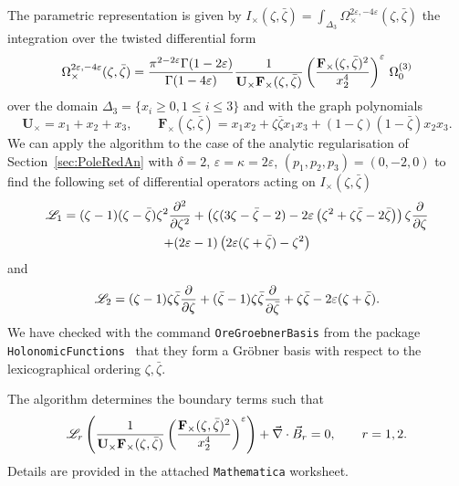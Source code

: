 \documentclass[a4paper,12pt]{article}
\numberwithin{equation}{section}
\numberwithin{figure}{section}
\begin{document}
The parametric representation is given by
$
  I_\times(\zeta,\bar\zeta)= \int_{\Delta_3}   \Omega_\times^{2\varepsilon,-4\varepsilon}(\zeta,\bar\zeta)
$ the integration over the twisted differential form
\begin{equation}
  \Omega_\times^{2\varepsilon,-4\varepsilon}(\zeta,\bar\zeta)={\pi^{2-2\varepsilon}\Gamma(1-2\varepsilon)\over\Gamma(1-4\varepsilon)} {1\over \textbf{U}_\times
    \textbf{F}_\times (\zeta,\bar\zeta)} \left(
    \textbf{F}_\times (\zeta,\bar\zeta)^{2}\over  x_2^{4}\right)^\varepsilon  \, \Omega_0^{(3)}
\end{equation}
over the domain $\Delta_3=\{x_i\geq0, 1\leq i\leq 3\}$ and with the graph polynomials
\begin{equation}
  \textbf{U}_\times= x_1+x_2+x_3,  \qquad \textbf{F}_\times (\zeta,\bar\zeta)= x_1x_2+
  \zeta\bar\zeta x_1x_3+ (1-\zeta)(1-\bar\zeta)x_2x_3  .
\end{equation}
We can apply the algorithm to the case of the analytic regularisation
of Section~\ref{sec:PoleRedAn} 
with $\delta=2$, $\varepsilon=\kappa=2\varepsilon$, $(p_1,p_2,p_3)=(0,-2,0)$
to find the following set of  differential operators
acting on $I_\times(\zeta,\bar\zeta)$
\begin{multline}
  \mathscr{L}_1= (\zeta -1) (\zeta -\bar\zeta) \zeta ^2{\partial^2\over\partial\zeta^2}  +
   \left(\zeta (3 \zeta -\bar\zeta-2)-2\varepsilon  \left(\zeta ^2+\zeta 
   \bar\zeta-2 \bar\zeta\right) \right) \zeta {\partial\over\partial\zeta}\cr+(2 \varepsilon -1) \left(2 \varepsilon  (\zeta +\bar\zeta)-\zeta ^2\right)
\end{multline}
and
\begin{equation}
  \mathscr{L}_{2}= (\zeta -1)\zeta\bar\zeta{\partial\over\partial\zeta}  +
   (\bar\zeta -1)\zeta\bar\zeta{\partial\over\partial\bar\zeta}+\zeta\bar\zeta-2\varepsilon(\zeta+\bar\zeta).
 \end{equation}
 We have checked  with
  the command {\tt OreGroebnerBasis} from the package {\tt
    HolonomicFunctions}~\cite{Koutchan} that
they form a Gr\"obner basis with respect to the lexicographical
ordering $\zeta,\bar\zeta$.

 The algorithm determines the boundary terms 
 such that
 \begin{equation}
   \mathscr{L}_r    \left( {1\over \textbf{U}_\times
    \textbf{F}_\times (\zeta,\bar\zeta)} \left(
    \textbf{F}_\times (\zeta,\bar\zeta)^{2}\over
    x_2^{4}\right)^\varepsilon \right)+ \vec\nabla\cdot\vec B_r=0,
\qquad r=1,2.
\end{equation}
%
Details are provided in the  attached {\tt Mathematica} worksheet. 
\end{document}
